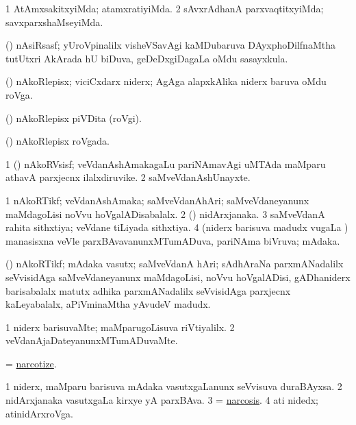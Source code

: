 \bentry
{}
\gl{\kirxvi}
\bmng
\bnum
\num{1} AtAmxsakitxyiMda; atamxratiyiMda. 
\num{2} sAvxrAdhanA parxvaqtitxyiMda; savxparxshaMseyiMda. 
\enum
\emng
\eentry

\bentry
{}
\gl{\nA}
\bmng
(\savi) nAsiRsasf; yUroVpinalilx visheVSavAgi kaMDubaruva DAyxphoDilfnaMtha tutUtxri AkArada hU biDuva, geDeDxgiDagaLa oMdu sasayxkula. 
\emng
\eentry

\bentry
{}
\gl{\nA}
\bmng
(\veYshA) nAkoRlepisx; viciCxdarx niderx; AgAga alapxkAlika niderx baruva oMdu roVga. 
\emng
\eentry

\bentry
{}
\gl{\nA}
\bmng
(\veYshA) nAkoRlepisx piVDita (roVgi). 
\emng
\eentry

\bentry
{}
\gl{\gu}
\bmng
(\veYshA) nAkoRlepisx roVgada. 
\emng
\eentry

\bentry
{}
\gl{\nA}
\bmng
\bnum
\num{1} (\veYshA) nAkoRVsisf; veVdanAshAmakagaLu pariNAmavAgi uMTAda maMparu athavA parxjecnx ilalxdiruvike. 
\num{2} saMveVdanAshUnayxte. 
\enum
\emng
\eentry

\bentry
{}
\gl{\gu}
\bmng
\bnum
\num{1} nAkoRTikf; veVdanAshAmaka; saMveVdanAhAri; saMveVdaneyanunx maMdagoLisi noVvu hoVgalADisabalalx. 
\num{2} (\rUpa) nidArxjanaka. 
\num{3} saMveVdanA rahita sithxtiya; veVdane tiLiyada sithxtiya. 
\num{4} (niderx barisuva madudx \mo vugaLa \vi) manasisxna veVle parxBAvavanunxMTumADuva, pariNAma biVruva; mAdaka. 
\enum
\emng
\eentry

\bentry
{}
\gl{\nA}
\bmng
(\veYshA) nAkoRTikf; mAdaka vasutx; saMveVdanA hAri; sAdhAraNa parxmANadalilx seVvisidAga saMveVdaneyanunx maMdagoLisi, noVvu hoVgalADisi, gADhaniderx barisabalalx matutx adhika parxmANadalilx seVvisidAga parxjecnx kaLeyabalalx, aPiVminaMtha yAvudeV madudx. 
\emng
\eentry

\bentry
{}
\gl{\kirxvi}
\bmng
\bnum
\num{1} niderx barisuvaMte; maMparugoLisuva riVtiyalilx. 
\num{2} veVdanAjaDateyanunxMTumADuvaMte. 
\enum
\emng
\eentry

\bentry
{}
\gl{\kirx}
\bmng
= \hyperlink{narcotize}{narcotize}. 
\emng
\eentry

\bentry
{}
\gl{\nA}
\bmng
\bnum
\num{1} niderx, maMparu barisuva mAdaka vasutxgaLanunx seVvisuva duraBAyxsa. 
\num{2} nidArxjanaka vasutxgaLa kirxye yA parxBAva. 
\num{3} = \hyperlink{narcosis}{narcosis}.
\num{4} ati nidedx; atinidArxroVga. 
\enum
\emng
\eentry

